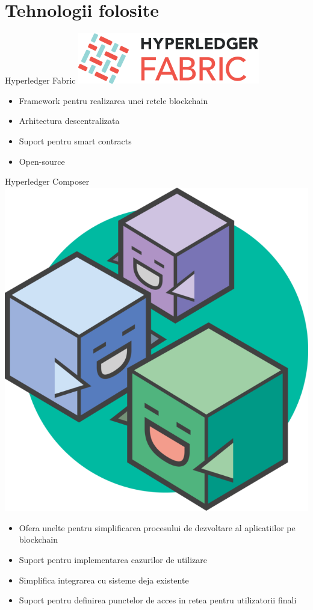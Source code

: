 \documentclass[10pt]{beamer}
\begin{document}
  \section{Tehnologii folosite}
  \begin{frame}{Hyperledger Fabric}
  	\includegraphics[scale=0.25]{fabric.png}

  	\begin{itemize}
  		\item Framework pentru realizarea unei retele blockchain
  		\item Arhitectura descentralizata
  		\item Suport pentru smart contracts
  		\item Open-source
  	\end{itemize}
  \end{frame}
  \begin{frame}{Hyperledger Composer}
  	\includegraphics[scale=0.25]{comp.png}
  	\begin{itemize}
  		\item Ofera unelte pentru simplificarea procesului de dezvoltare al aplicatiilor pe blockchain
  		\item Suport pentru implementarea cazurilor de utilizare 
  		\item Simplifica integrarea cu sisteme deja existente
  		\item Suport pentru definirea punctelor de acces in retea pentru utilizatorii finali
  	\end{itemize}
  \end{frame}   
\end{document}
